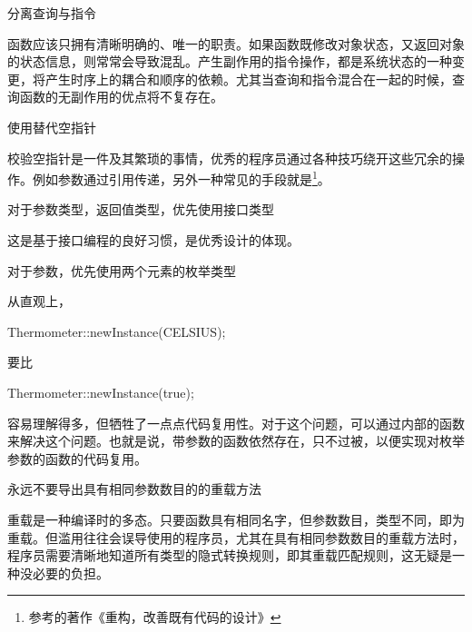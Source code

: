 \begin{content}
\begin{regulation}
分离查询与指令
\end{regulation}

函数应该只拥有清晰明确的、唯一的职责。如果函数既修改对象状态，又返回对象的状态信息，则常常会导致混乱。产生副作用的指令操作，都是系统状态的一种变更，将产生时序上的耦合和顺序的依赖。尤其当查询和指令混合在一起的时候，查询函数的无副作用的优点将不复存在。

\begin{regulation}
使用替代空指针
\end{regulation}

校验空指针是一件及其繁琐的事情，优秀的程序员通过各种技巧绕开这些冗余的操作。例如参数通过引用传递，另外一种常见的手段就是\footnote{参考的著作《重构，改善既有代码的设计》}。

\begin{regulation}
对于参数类型，返回值类型，优先使用接口类型
\end{regulation}

这是基于接口编程的良好习惯，是优秀设计的体现。

\begin{regulation}
对于参数，优先使用两个元素的枚举类型
\end{regulation}

从直观上，

\begin{leftbar}
\begin{c++}
Thermometer::newInstance(CELSIUS);
\end{c++}
\end{leftbar}

要比

\begin{leftbar}
\begin{c++}
Thermometer::newInstance(true);
\end{c++}
\end{leftbar}

容易理解得多，但牺牲了一点点代码复用性。对于这个问题，可以通过内部的函数来解决这个问题。也就是说，带参数的函数依然存在，只不过被，以便实现对枚举参数的函数的代码复用。

\begin{regulation}
永远不要导出具有相同参数数目的的重载方法
\end{regulation}

重载是一种编译时的多态。只要函数具有相同名字，但参数数目，类型不同，即为重载。但滥用往往会误导使用的程序员，尤其在具有相同参数数目的重载方法时，程序员需要清晰地知道所有类型的隐式转换规则，即其重载匹配规则，这无疑是一种没必要的负担。


\end{content}
